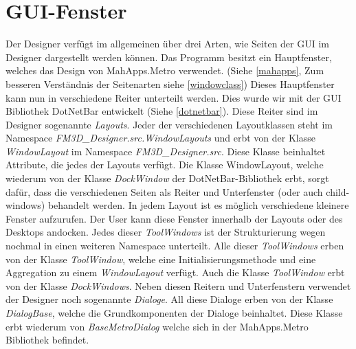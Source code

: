 \section{GUI-Fenster}
\label{guifenster0}

Der Designer verfügt im allgemeinen über drei Arten, wie Seiten der GUI im Designer dargestellt werden können. Das Programm besitzt ein Hauptfenster, welches das Design von MahApps.Metro verwendet. (Siehe \cref{mahapps}, Zum besseren Verständnis der Seitenarten siehe \cref{windowclass})
Dieses Hauptfenster kann nun in verschiedene Reiter unterteilt werden. Dies wurde wir mit der GUI Bibliothek DotNetBar entwickelt (Siehe \cref{dotnetbar}).
Diese Reiter sind im Designer sogenannte \textit{Layouts}. Jeder der verschiedenen Layoutklassen steht im Namespace \textit{FM3D\_Designer.src.WindowLayouts} und erbt von der Klasse \textit{WindowLayout} im Namespace \textit{FM3D\_Designer.src}. Diese Klasse beinhaltet Attribute, die jedes der Layouts verfügt.
Die Klasse WindowLayout, welche wiederum von der Klasse \textit{DockWindow} der DotNetBar-Bibliothek erbt, sorgt dafür, dass die verschiedenen Seiten als Reiter und Unterfenster (oder auch child-windows) behandelt werden.
In jedem Layout ist es möglich verschiedene  kleinere Fenster aufzurufen. Der User kann diese Fenster innerhalb der Layouts oder des Desktops andocken. Jedes dieser \textit{ToolWindows} ist der Strukturierung wegen nochmal in einen weiteren Namespace unterteilt. Alle dieser \textit{ToolWindows} erben von der Klasse \textit{ToolWindow}, welche eine Initialisierungsmethode und eine Aggregation zu einem \textit{WindowLayout} verfügt.
Auch die Klasse \textit{ToolWindow} erbt von der Klasse \textit{DockWindows}.
Neben diesen Reitern und Unterfenstern verwendet der Designer noch sogenannte \textit{Dialoge}. All diese Dialoge erben von der Klasse \textit{DialogBase}, welche die Grundkomponenten der Dialoge beinhaltet. Diese Klasse erbt wiederum von \textit{BaseMetroDialog} welche sich in der MahApps.Metro Bibliothek befindet. 

